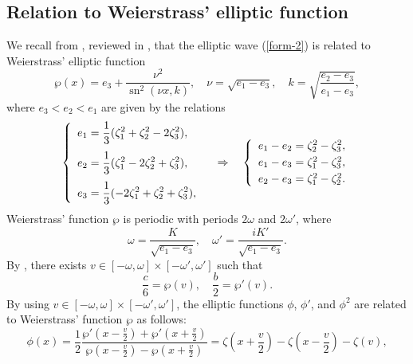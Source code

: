 \documentclass[12pt,reqno]{amsart}
\numberwithin{equation}{section}
\DeclareMathOperator{\sn}{sn}
\begin{document}
\subsection{Relation to Weierstrass' elliptic function}
\label{sec-2-1}

We recall from \cite{A1990,W}, reviewed in \cite{AP25}, that the elliptic wave (\ref{form-2}) is related to Weierstrass' elliptic function 
\begin{equation}
\label{rel-Jac-Wei}
\wp(x) = e_3 + \frac{\nu^2}{\sn^2(\nu x,k)}, \quad \nu = \sqrt{e_1-e_3}, \quad k = \sqrt{\frac{e_2-e_3}{e_1-e_3}},
\end{equation}
where $e_3 < e_2 < e_1$ are given by the relations
\begin{equation}
\label{rel-par-e-zeta}
\left\{ \begin{array}{l} 
\displaystyle e_1 = \frac{1}{3} (\zeta_1^2 + \zeta_2^2 - 2 \zeta_3^2), \vspace{0.25cm} \\
\displaystyle e_2 = \frac{1}{3} (\zeta_1^2 - 2 \zeta_2^2 + \zeta_3^2), 
\vspace{0.25cm} \\
\displaystyle e_3 = \frac{1}{3} (-2 \zeta_1^2 + \zeta_2^2 + \zeta_3^2),
\end{array} \right.
\quad \Rightarrow \quad 
\left\{ \begin{array}{l} 
e_1 - e_2 = \zeta_2^2 - \zeta_3^2,
\vspace{0.1cm} \\
e_1 - e_3 = \zeta_1^2 - \zeta_3^2, 
\vspace{0.1cm}\\
e_2 - e_3 = \zeta_1^2 - \zeta_2^2.
\end{array} \right.
\end{equation}
Weierstrass' function $\wp$ is periodic with periods $2\omega$ and $2 \omega'$, where 
\begin{equation}
\label{periods}
\omega = \frac{K}{\sqrt{e_1 - e_3}}, \quad 
\omega' = \frac{i K'}{\sqrt{e_1 - e_3}}.
\end{equation}
By \cite[Lemma 3.4]{AP25}, there exists $v \in [-\omega,\omega] \times [-\omega',\omega']$ such that   
\begin{equation}\label{pcW}
\frac{c}{6}=\wp(v), \quad \frac{b}{2}=\wp'(v).
\end{equation}
By using $v \in [-\omega,\omega] \times [-\omega',\omega']$, the elliptic functions $\phi$, $\phi'$, and $\phi^2$ are related to Weierstrass' function 
$\wp$ as follows:
\begin{equation}
\label{phinova}
\phi(x) = \frac{1}{2}\frac{\wp'(x-\frac{v}{2})+\wp'(x+\frac{v}{2})}{\wp(x-\frac{v}{2})-\wp(x + \frac{v}{2})} = \zeta\left(x+\frac{v}{2}\right)-\zeta\left(x-\frac{v}{2}\right)-\zeta(v),
\end{equation}
\end{document}
